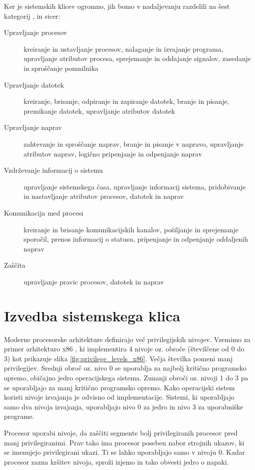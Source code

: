 \documentclass[a4paper,12pt,openright]{book}
\begin{document}
Ker je sistemskih klicev ogromno, jih bomo v nadaljevanju razdelili na šest kategorij \cite{Silberschatz_Galvin_Gagne_2018}, in sicer:
\begin{description}
	\item[Upravljanje procesov] kreiranje in ustavljanje procesov, nalaganje in izvajanje programa, upravljanje atributov procesa, sprejemanje in oddajanje signalov, zasedanje in sproščanje pomnilnika
	\item[Upravljanje datotek] kreiranje, brisanje, odpiranje in zapiranje datotek, branje in pisanje, premikanje datotek, upravljanje atributov datotek
	\item[Upravljanje naprav] zahtevanje in sproščanje naprav, branje in pisanje v napravo, upravljanje atributov naprav, logično pripenjanje in odpenjanje naprav
	\item[Vzdrževanje informacij o sistemu] upravljanje sistemskega časa, upravljanje informacij sistema, pridobivanje in nastavljanje atributov procesov, datotek in naprav
	\item[Komunikacija med procesi] kreiranje in brisanje komunikacijskih kanalov, pošiljanje in sprejemanje sporočil, prenos informacij o statusu, pripenjanje in odpenjanje oddaljenih naprav
	\item[Zaščita] upravljanje pravic procesov, datotek in naprav
\end{description}

\section{Izvedba sistemskega klica} \label{sec:syscall_execution}

Moderne procesorske arhitekture definirajo več privilegijskih nivojev.
Vzemimo za primer arhitekturo x86 \cite{Intel_2024}, ki implementira 4 nivoje oz. obroče (številčene od 0 do 3) kot prikazuje slika \ref{fig:privilege_levels_x86}.
Večja številka pomeni manj privilegijev.
Srednji obroč oz. nivo 0 se uporablja za najbolj kritično programsko opremo, običajno jedro operacijskega sistema.
Zunanji obroči oz. nivoji 1 do 3 pa se uporabljajo za manj kritično programsko opremo.
Kako operacijski sistem koristi nivoje izvajanja je odvisno od implementacije.
Sistemi, ki uporabljajo samo dva nivoja izvajanja, uporabljajo nivo 0 za jedro in nivo 3 za uporabniške programe.

Procesor uporabi nivoje, da zaščiti segmente bolj privilegiranih procesov pred manj privilegiranimi.
Prav tako ima procesor poseben nabor strojnih ukazov, ki se imenujejo privilegirani ukazi.
Ti se lahko uporabljajo samo v nivoju 0.
Kadar procesor zazna kršitev nivoja, sproži izjemo in tako obvesti jedro o napaki.
\end{document}
